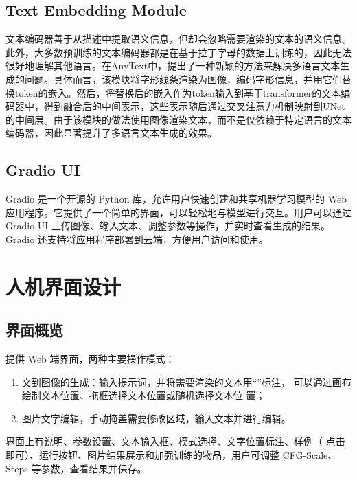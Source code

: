 \documentclass[a4paper,12pt]{article}
\begin{document}
\subsection{Text Embedding Module}
文本编码器善于从描述中提取语义信息，但却会忽略需要渲染的文本的语义信息。此外，大多数预训练的文本编码器都是在基于拉丁字母的数据上训练的，因此无法很好地理解其他语言。在AnyText中，提出了一种新颖的方法来解决多语言文本生成的问题。具体而言，该模块将字形线条渲染为图像，编码字形信息，并用它们替换token的嵌入。然后，将替换后的嵌入作为token输入到基于transformer的文本编码器中，得到融合后的中间表示，这些表示随后通过交叉注意力机制映射到UNet的中间层。由于该模块的做法使用图像渲染文本，而不是仅依赖于特定语言的文本编码器，因此显著提升了多语言文本生成的效果。
\subsection{Gradio UI}
Gradio 是一个开源的 Python 库，允许用户快速创建和共享机器学习模型的 Web 应用程序。它提供了一个简单的界面，可以轻松地与模型进行交互。用户可以通过 Gradio UI 上传图像、输入文本、调整参数等操作，并实时查看生成的结果。Gradio 还支持将应用程序部署到云端，方便用户访问和使用。
\section{人机界面设计}
\subsection{界面概览}
提供 Web 端界面，两种主要操作模式：
\begin{enumerate}
    \item 文到图像的生成：输入提示词，并将需要渲染的文本用“”标注，
    可以通过画布绘制文本位置、拖框选择文本位置或随机选择文本位
    置；
    \item 图片文字编辑，手动掩盖需要修改区域，输入文本并进行编辑。

\end{enumerate}

界面上有说明、参数设置、文本输入框、模式选择、文字位置标注、样例（
点击即可）、运行按钮、图片结果展示和加强训练的物品，用户可调整 CFG-Scale、Steps 等参数，查看结果并保存。
\end{document}
